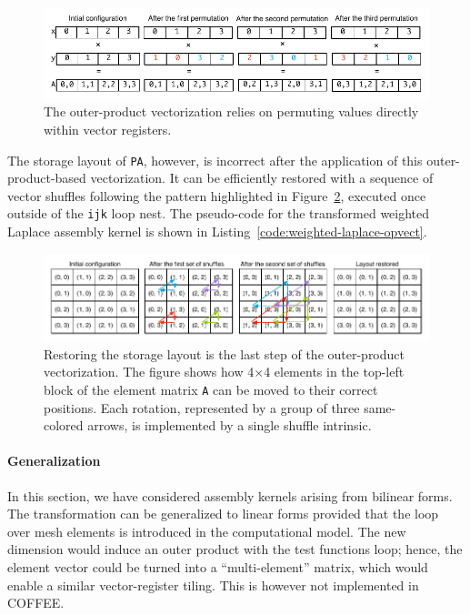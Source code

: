 \begin{figure}[h]
\centerline{\includegraphics[scale=0.9]{lowlevelopt/pictures/vect-by-vect-inline.pdf}}
\caption{The outer-product vectorization relies on permuting values directly within vector registers.}
\label{fig:vect-by-vect}
\end{figure}

The storage layout of {\tt PA}, however, is incorrect after the application of this outer-product-based vectorization. It can be efficiently restored with a sequence of vector shuffles following the pattern highlighted in Figure~\ref{fig:restore-layout}, executed once outside of the \texttt{ijk} loop nest. The pseudo-code for the transformed weighted Laplace assembly kernel is shown in Listing~\ref{code:weighted-laplace-opvect}.

\begin{figure}[h]
\centerline{\includegraphics[scale=0.9]{lowlevelopt/pictures/vect-restore-inline.pdf}}
\caption{Restoring the storage layout is the last step of the outer-product vectorization. The figure shows how 4$\times$4 elements in the top-left block of the element matrix {\tt A} can be moved to their correct positions. Each rotation, represented by a group of three same-colored arrows, is implemented by a single shuffle intrinsic.}
\label{fig:restore-layout}
\end{figure}

\paragraph{Generalization}
In this section, we have considered assembly kernels arising from bilinear forms. The transformation can be generalized to linear forms provided that the loop over mesh elements is introduced in the computational model. The new dimension would induce an outer product with the test functions loop; hence, the element vector could be turned into a ``multi-element'' matrix, which would enable a similar vector-register tiling. This is however not implemented in COFFEE.

